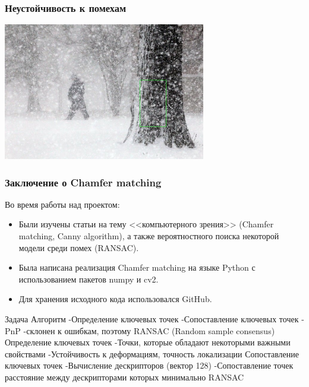\begin{frame}\frametitle{Неустойчивость к помехам}
    \begin{center}
        \includegraphics[height=6cm]{veselov_imgs/occurrence2.jpg}
    \end{center}
\end{frame}

\begin{frame}\frametitle{Заключение о Chamfer matching}
    Во время работы над проектом:
    \begin{itemize}
        \item Были изучены статьи на тему
        <<компьютерного зрения>> (Chamfer matching, Canny algorithm), а также
        вероятностного поиска некоторой модели среди помех (RANSAC).
        
        \item Была написана реализация Chamfer matching на языке Python с
        использованием пакетов numpy и cv2.
        
        \item Для хранения исходного кода использовался GitHub.
    \end{itemize}
\end{frame}

Задача
Алгоритм
-Определение ключевых точек
-Сопоставление ключевых точек
-PnP
-склонен к ошибкам, поэтому RANSAC (Random sample consensus)
Определение ключевых точек
-Точки, которые обладают некоторыми важными свойствами
-Устойчивость к деформациям, точность локализации
Сопоставление ключевых точек
-Вычисление дескрипторов (вектор 128)
-Сопоставление точек расстояние между дескрипторами которых минимально
RANSAC

